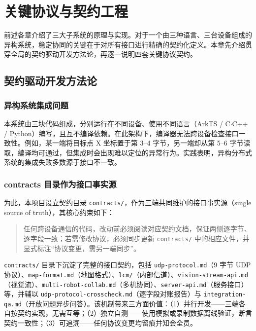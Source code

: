 \chapter{关键协议与契约工程}
\label{ch:protocols}

前述各章介绍了三大子系统的原理与实现。对于一个由三种语言、三台设备组成的异构系统，稳定协同的关键在于对所有接口进行精确的契约化定义。本章先介绍贯穿全局的契约驱动开发方法论，再逐一说明四套关键协议契约。

\section{契约驱动开发方法论}
\label{sec:contract-methodology}

\subsection{异构系统集成问题}
\label{sec:heterogeneous-integration}

本系统由三块代码组成，分别运行在不同设备、使用不同语言（ArkTS / C$\cdot$C++ / Python）编写，且互不编译依赖。在此架构下，编译器无法跨设备检查接口一致性。例如，某一端将目标点 X 坐标置于第 3--4 字节，另一端却从第 5--6 字节读取，编译均可通过，但集成时会出现难以定位的异常行为。实践表明，异构分布式系统的集成失败多数源于接口不一致。

\subsection{contracts 目录作为接口事实源}
\label{sec:contracts-directory}

为此，本项目设立契约目录 \texttt{contracts/}，作为三端共同维护的接口事实源（single source of truth），其核心约束如下：

\begin{quote}
任何跨设备通信的代码，改动前必须阅读对应契约文档，保证两侧逐字节、逐字段一致；若需修改协议，必须同步更新 \texttt{contracts/} 中的相应文件，并显式标注“协议变更，需另一端同步”。
\end{quote}

\texttt{contracts/} 目录下沉淀了完整的接口契约，包括 \texttt{udp-protocol.md}（9 字节 UDP 协议）、\texttt{map-format.md}（地图格式）、\texttt{lcm/}（内部信道）、\texttt{vision-stream-api.md}（视觉流）、\texttt{multi-robot-collab.md}（多机协同）、\texttt{server-api.md}（服务接口）等，并辅以 \texttt{udp-protocol-crosscheck.md}（逐字段对账报告）与 \texttt{integration-qa.md}（开放问题异步问答）。该机制带来三方面价值：（1）并行开发——三端各自按契约实现，无需互等；（2）独立自测——使用模拟或录制数据离线验证，断言契约一致性；（3）可追溯——任何协议变更均留痕并知会全员。

